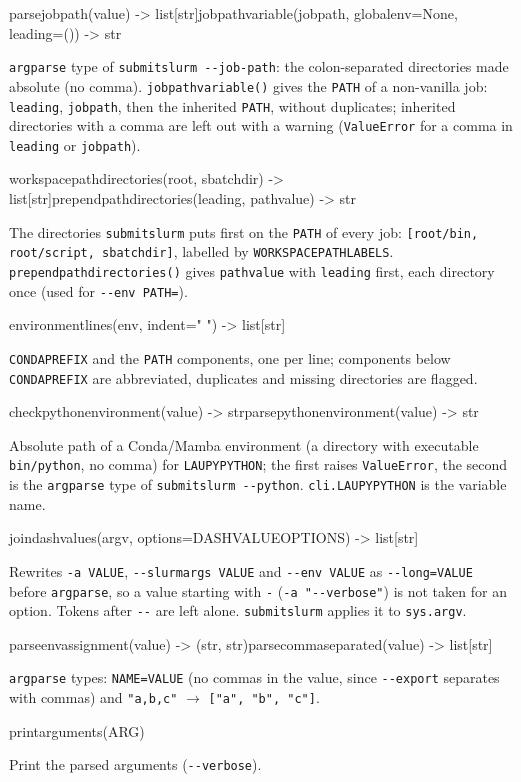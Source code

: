 \documentclass[11pt,a4paper]{article}
\newcommand{\api}[1]{%
  \par\medskip
  \begin{tcolorbox}[colback=sigbg, colframe=sigbg, boxrule=0pt, arc=1pt, left=4pt, right=4pt, top=2pt, bottom=2pt, breakable]
  \raggedright\ttfamily\small #1
  \end{tcolorbox}\nopagebreak\vspace{-4pt}%
}
\DeclareRobustCommand{\_}{\textunderscore\allowbreak}
\newcommand{\cmd}[1]{\texttt{#1}}
\begin{document}
\api{parse\_job\_path(value) -> list[str]\quad job\_path\_variable(job\_path, global\_env=None, leading=()) -> str}
\cmd{argparse} type of \cmd{submitslurm -{}-job-path}: the colon-separated directories made absolute
(no comma). \cmd{job\_path\_variable()} gives the \cmd{PATH} of a non-vanilla job: \cmd{leading},
\cmd{job\_path}, then the inherited \cmd{PATH}, without duplicates; inherited directories with a comma
are left out with a warning (\cmd{ValueError} for a comma in \cmd{leading} or \cmd{job\_path}).

\api{workspace\_path\_directories(root, sbatch\_dir) -> list[str]\quad prepend\_path\_directories(leading, path\_value) -> str}
The directories \cmd{submitslurm} puts first on the \cmd{PATH} of every job:
\cmd{[root/bin, root/script, sbatch\_dir]}, labelled by \cmd{WORKSPACE\_PATH\_LABELS}.
\cmd{prepend\_path\_directories()} gives \cmd{path\_value} with \cmd{leading} first, each directory
once (used for \cmd{-{}-env PATH=}).

\api{environment\_lines(env, indent="    ") -> list[str]}
\cmd{CONDA\_PREFIX} and the \cmd{PATH} components, one per line; components below
\cmd{CONDA\_PREFIX} are abbreviated, duplicates and missing directories are flagged.

\api{check\_python\_environment(value) -> str\quad parse\_python\_environment(value) -> str}
Absolute path of a Conda/Mamba environment (a directory with executable \cmd{bin/python}, no comma) for
\cmd{LAUPY\_PYTHON}; the first raises \cmd{ValueError}, the second is the \cmd{argparse} type of
\cmd{submitslurm -{}-python}. \cmd{cli.LAUPY\_PYTHON} is the variable name.

\api{join\_dash\_values(argv, options=DASH\_VALUE\_OPTIONS) -> list[str]}
Rewrites \cmd{-a VALUE}, \cmd{-{}-slurmargs VALUE} and \cmd{-{}-env VALUE} as \cmd{-{}-long=VALUE} before
\cmd{argparse}, so a value starting with \cmd{-} (\cmd{-a "-{}-verbose"}) is not taken for an option.
Tokens after \cmd{-{}-} are left alone. \cmd{submitslurm} applies it to \cmd{sys.argv}.

\api{parse\_env\_assignment(value) -> (str, str)\quad parse\_comma\_separated(value) -> list[str]}
\cmd{argparse} types: \cmd{NAME=VALUE} (no commas in the value, since \cmd{-{}-export} separates
with commas) and \cmd{"a,b,c"} $\rightarrow$ \cmd{["a", "b", "c"]}.

\api{print\_arguments(ARG)}
Print the parsed arguments (\cmd{-{}-verbose}).

\end{document}
